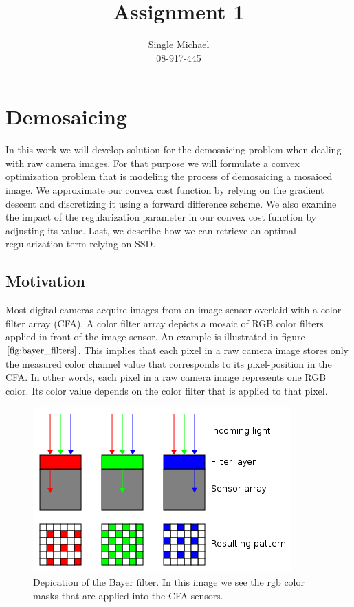\documentclass{paper}
\title{Assignment 1}
\author{Single Michael\\08-917-445}
\begin{document}
\maketitle


%

\section{Demosaicing}
In this work we will develop solution for the demosaicing problem when dealing with raw camera images. For that purpose we will formulate a convex optimization problem that is modeling the process of demosaicing a mosaiced image. We approximate our convex cost function by relying on the gradient descent and discretizing it using a forward difference scheme. We also examine the impact of the regularization parameter in our convex cost function by adjusting its value. Last, we describe how we can retrieve an optimal regularization term relying on SSD. 

\subsection{Motivation}
Most digital cameras acquire images from an image sensor overlaid with a color filter array (CFA). A color filter array depicts a mosaic of RGB color filters applied in front of the image sensor. An example is illustrated in figure $\ref{fig:bayer_filters}$. This implies that each pixel in a raw camera image stores only the measured color channel value that corresponds to its pixel-position in the CFA. In other words, each pixel in a raw camera image represents one RGB color. Its color value depends on the color filter that is applied to that pixel. 

\begin{figure}[H]
\begin{center}
\quad\quad   \includegraphics[width=0.8\linewidth]{figures/bayerfilter}
\end{center}
\caption{Depication of the Bayer filter. In this image we see the rgb color masks that are applied into the CFA sensors.}
\label{fig:bayer_filters}
\end{figure}
\end{document}
